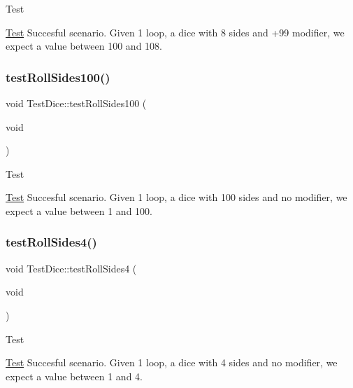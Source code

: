 \begin{DoxyRefDesc}{Test}
\item[\hyperlink{test__test000004}{Test}]Succesful scenario. Given 1 loop, a dice with 8 sides and +99 modifier, we expect a value between 100 and 108. \end{DoxyRefDesc}
\hypertarget{class_test_dice_a6117f3360b40fadea30354440019948a}{}\label{class_test_dice_a6117f3360b40fadea30354440019948a} 
\subsubsection{\texorpdfstring{test\+Roll\+Sides100()}{testRollSides100()}}
{\footnotesize\ttfamily void Test\+Dice\+::test\+Roll\+Sides100 (\begin{DoxyParamCaption}\item[{void}]{ }\end{DoxyParamCaption})\hspace{0.3cm}{\ttfamily [protected]}}

\begin{DoxyRefDesc}{Test}
\item[\hyperlink{test__test000002}{Test}]Succesful scenario. Given 1 loop, a dice with 100 sides and no modifier, we expect a value between 1 and 100. \end{DoxyRefDesc}
\hypertarget{class_test_dice_ae621d5b78bffd9b5a52cce4d9177aa2f}{}\label{class_test_dice_ae621d5b78bffd9b5a52cce4d9177aa2f} 
\subsubsection{\texorpdfstring{test\+Roll\+Sides4()}{testRollSides4()}}
{\footnotesize\ttfamily void Test\+Dice\+::test\+Roll\+Sides4 (\begin{DoxyParamCaption}\item[{void}]{ }\end{DoxyParamCaption})\hspace{0.3cm}{\ttfamily [protected]}}

\begin{DoxyRefDesc}{Test}
\item[\hyperlink{test__test000001}{Test}]Succesful scenario. Given 1 loop, a dice with 4 sides and no modifier, we expect a value between 1 and 4. \end{DoxyRefDesc}
\hypertarget{class_test_dice_ab54f699e2f2d4f00356ff8e7fb70cff2}{}\label{class_test_dice_ab54f699e2f2d4f00356ff8e7fb70cff2} 
